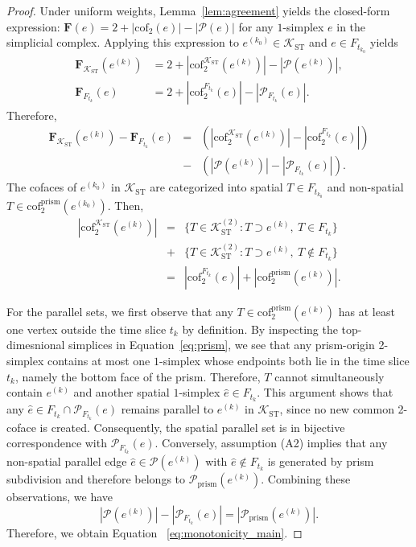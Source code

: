 \documentclass[10pt,a4paper]{amsart}
\newcommand{\F}{\mathbf{F}}        %
\newcommand{\K}{\mathcal{K}}
\begin{document}
\begin{proof}
Under uniform weights, Lemma~\ref{lem:agreement} yields the closed-form expression:
$\F(e) = 2 + |\mathrm{cof}_2(e)| - |\mathcal{P}(e)|$ for any $1$-simplex $e$ in the simplicial complex.
Applying this expression to $e^{(k_0)} \in \K_{\mathrm{ST}}$ and $e \in F_{t_{k_0}}$ yields
\begin{align*}
\F_{\K_{\mathrm{ST}}}(e^{(k)}) &= 2 + |\mathrm{cof}_2^{\K_{\mathrm{ST}}}(e^{(k)})| - |\mathcal{P}(e^{(k)})|, \\
\F_{F_{t_k}}(e) &= 2 + |\mathrm{cof}_2^{F_{t_k}}(e)| - |\mathcal{P}_{F_{t_k}}(e)|.
\end{align*}
Therefore,
\begin{eqnarray}\label{eq:result_step1}
\F_{\K_{\mathrm{ST}}}(e^{(k)}) - \F_{F_{t_{k}}}(e) &=& (|\mathrm{cof}_2^{\K_{\mathrm{ST}}}(e^{(k)})| - |\mathrm{cof}_2^{F_{t_k}}(e)|)\nonumber\\
&-& (|\mathcal{P}(e^{(k)})| - |\mathcal{P}_{F_{t_k}}(e)|).
\end{eqnarray}
The cofaces of $e^{(k_0)}$ in $\K_{\mathrm{ST}}$ are categorized into spatial $T \in F_{t_{k_0}}$ and non-spatial $T \in \mathrm{cof}_2^{\mathrm{prism}}(e^{(k_0)})$. Then,
\begin{eqnarray*}
|\mathrm{cof}_2^{\K_{\mathrm{ST}}}(e^{(k)})| &=& \{T \in \K_{\mathrm{ST}}^{(2)} : T \supset e^{(k)},\ T \in F_{t_k}\}\\
&+& \{T \in \K_{\mathrm{ST}}^{(2)} : T \supset e^{(k)},\ T \notin F_{t_k}\}\\
&=& |\mathrm{cof}_2^{F_{t_k}}(e)| + |\mathrm{cof}_2^{\mathrm{prism}}(e^{(k)})|.
\end{eqnarray*}

For the parallel sets, we first observe  that any $T \in \mathrm{cof}_2^{\mathrm{prism}}(e^{(k)})$ has at least one vertex outside the time slice $t_k$ by definition.
By inspecting the top-dimesnional simplices in Equation~\eqref{eq:prism}, we see that any prism-origin 2-simplex contains at most one $1$-simplex whose endpoints both lie in the time slice $t_k$, namely the bottom face of the prism.
Therefore, $T$ cannot simultaneously contain $e^{(k)}$ and another spatial $1$-simplex $\hat e \in F_{t_k}$.
This argument shows that any $\hat e \in F_{t_k} \cap \mathcal{P}_{F_{t_k}}(e)$ remains parallel to $e^{(k)}$ in $\K_{\mathrm{ST}}$, since no new common 2-coface is created. Consequently, the spatial parallel set is in bijective correspondence with $\mathcal{P}_{F_{t_k}}(e)$.
Conversely, assumption (A2) implies that any non-spatial parallel edge $\hat e \in \mathcal{P}(e^{(k)})$ with $\hat e \notin F_{t_k}$ is generated by prism subdivision and therefore belongs to $\mathcal{P}_{\mathrm{prism}}(e^{(k)})$.
Combining these observations, we have
\begin{equation*}
|\mathcal{P}(e^{(k)})| - |\mathcal{P}_{F_{t_k}}(e)| = |\mathcal{P}_{\mathrm{prism}}(e^{(k)})|.
\end{equation*}
Therefore, we obtain Equation ~\eqref{eq:monotonicity_main}.


\end{proof}
\end{document}
